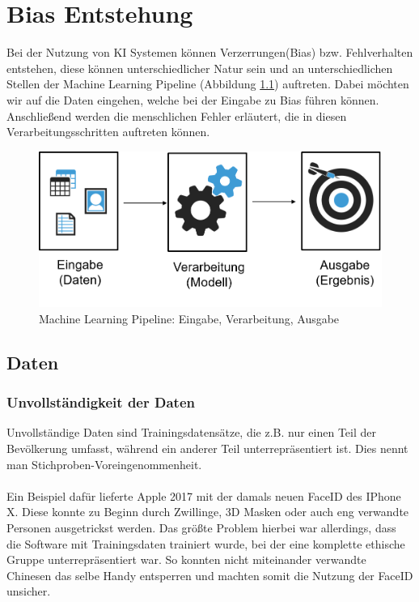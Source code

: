 \documentclass[12pt,oneside,a4paper,parskip]{scrbook}
\begin{document}
\chapter{Bias Entstehung}
\label{chapter:BiasEntstehung}
Bei der Nutzung von KI Systemen können Verzerrungen(Bias) bzw. Fehlverhalten entstehen, diese können unterschiedlicher Natur sein und an unterschiedlichen Stellen der Machine Learning Pipeline (Abbildung \ref{fig:dataBias}) auftreten. Dabei möchten wir auf die Daten eingehen, welche bei der Eingabe zu Bias führen können. Anschließend werden die menschlichen Fehler erläutert, die in diesen Verarbeitungsschritten auftreten können.

\begin{figure}[h]
	\begin{center}
		\includegraphics[width=12cm]{Bilder/data_bias.png}
		\caption{Machine Learning Pipeline: Eingabe, Verarbeitung, Ausgabe\cite{biasEffekt}}
		\label{fig:dataBias}
	\end{center}
\end{figure}

\section{Daten}
\label{section:data}
\subsection{Unvollständigkeit der Daten}
\label{section:uncompleteData}
Unvollständige Daten sind Trainingsdatensätze, die z.B. nur einen Teil der Bevölkerung umfasst, während ein anderer Teil unterrepräsentiert ist. Dies nennt man Stichproben-Voreingenommenheit.
\\\\
Ein Beispiel dafür lieferte Apple 2017 mit der damals neuen FaceID des IPhone X.
Diese konnte zu Beginn durch Zwillinge, 3D Masken oder auch eng verwandte Personen ausgetrickst werden. Das größte Problem hierbei war allerdings, dass die Software mit Trainingsdaten trainiert wurde, bei der eine komplette ethische Gruppe unterrepräsentiert war. So konnten nicht miteinander verwandte Chinesen das selbe Handy entsperren und machten somit die Nutzung der FaceID unsicher\cite{iphone}.
\end{document}
